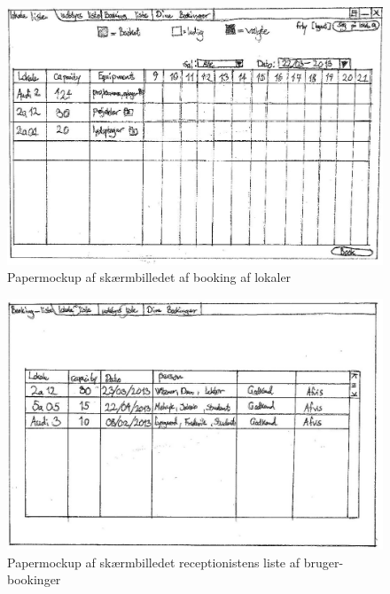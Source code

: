 \begin{figure}[h!]
  \centering
    \includegraphics[angle=90, height=0.9\textheight]{Appendix/GUI-Prototype/PaperMockup/LokaleListe_001}
  \caption{Papermockup af skærmbilledet af booking af lokaler}
\label{App_GUI_paper_LokaleListe}
\end{figure}

\begin{figure}[h!]
  \centering
    \includegraphics[angle=90, height=0.9\textheight]{Appendix/GUI-Prototype/PaperMockup/GodkendBookinger_001}
  \caption{Papermockup af  skærmbilledet receptionistens liste af bruger-bookinger}
\label{App_GUI_paper_GodkendBookinger}
\end{figure}

